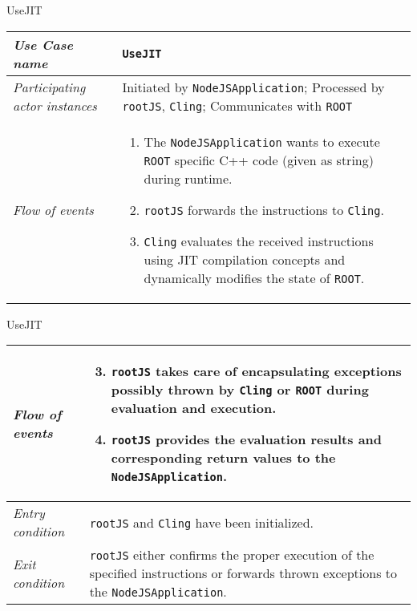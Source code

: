 \begin{frame}{UseJIT}
        \begin{longtable}{p{3cm} @{\hskip 1cm} p{7cm}}
                \hline

                \textit{Use Case name} & \texttt{UseJIT}\\
                \hline

                \textit{Participating actor instances} & Initiated by \texttt{NodeJSApplication}; Processed by \texttt{rootJS}, \texttt{Cling}; Communicates with \texttt{ROOT}\\
                \hline

                \textit{Flow of events} &
                        \begin{enumerate}
                                \item The \texttt{NodeJSApplication} wants to execute \texttt{ROOT} specific C++ code (given as string) during runtime.
                                \item \texttt{rootJS} forwards the instructions to \texttt{Cling}.
                                \item \texttt{Cling} evaluates the received instructions using JIT compilation concepts and dynamically modifies the state of \texttt{ROOT}.
                        \end{enumerate}
                        \\
        \end{longtable}
\end{frame}
\begin{frame}[t]{UseJIT}
        \begin{longtable}{p{3cm} @{\hskip 1cm} p{7cm}}
                \textit{Flow of events} &
                        \begin{enumerate}
                                \setcounter{enumi}{2}
                                \item \texttt{rootJS} takes care of encapsulating exceptions possibly thrown by \texttt{Cling} or \texttt{ROOT} during evaluation and execution.
                                \item \texttt{rootJS} provides the evaluation results and corresponding return values to the \texttt{NodeJSApplication}.
                        \end{enumerate}
                        \\
                \hline

                \textit{Entry condition} & \texttt{rootJS} and \texttt{Cling} have been initialized.\\
                \hline

                \textit{Exit condition} & \texttt{rootJS} either confirms the proper execution of the specified instructions or forwards thrown exceptions to the \texttt{NodeJSApplication}.\\
                \hline
        \end{longtable}
\end{frame}
